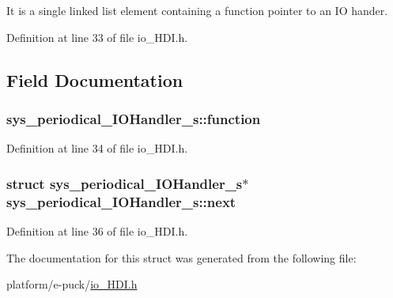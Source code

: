 It is a single linked list element containing a function pointer to an I\+O hander. 

Definition at line 33 of file io\+\_\+\+H\+D\+I.\+h.



\subsection{Field Documentation}
\hypertarget{structsys__periodical__IOHandler__s_af22c738940f827dc20853e9e0edc0a56}{}
\subsubsection[{function}]{ sys\+\_\+periodical\+\_\+\+I\+O\+Handler\+\_\+s\+::function}\label{structsys__periodical__IOHandler__s_af22c738940f827dc20853e9e0edc0a56}


Definition at line 34 of file io\+\_\+\+H\+D\+I.\+h.

\hypertarget{structsys__periodical__IOHandler__s_a36ad85ffbae299cfa418f69b6f2d745e}{}
\subsubsection[{next}]{\setlength{\rightskip}{0pt plus 5cm}struct {\bf sys\+\_\+periodical\+\_\+\+I\+O\+Handler\+\_\+s}$\ast$ sys\+\_\+periodical\+\_\+\+I\+O\+Handler\+\_\+s\+::next}\label{structsys__periodical__IOHandler__s_a36ad85ffbae299cfa418f69b6f2d745e}


Definition at line 36 of file io\+\_\+\+H\+D\+I.\+h.



The documentation for this struct was generated from the following file\+:\begin{DoxyCompactItemize}
\item 
platform/e-\/puck/\hyperlink{io__HDI_8h}{io\+\_\+\+H\+D\+I.\+h}\end{DoxyCompactItemize}
